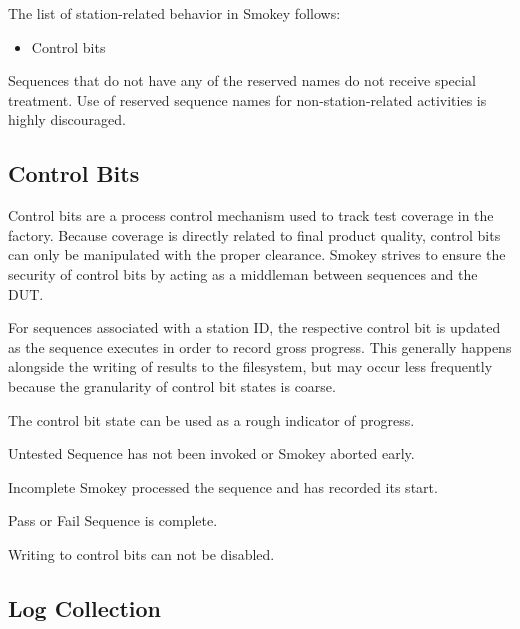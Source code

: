 The list of station-related behavior in Smokey follows:

\begin{itemize}

\item Control bits

\end{itemize}

Sequences that do not have any of the reserved names do not receive special
treatment.  Use of reserved sequence names for non-station-related activities
is highly discouraged.

\subsection{Control Bits}

Control bits are a process control mechanism used to track test coverage in the
factory.  Because coverage is directly related to final product quality,
control bits can only be manipulated with the proper clearance.  Smokey strives
to ensure the security of control bits by acting as a middleman between
sequences and the DUT.

For sequences associated with a station ID, the respective control bit is
updated as the sequence executes in order to record gross progress.  This
generally happens alongside the writing of results to the filesystem, but may
occur less frequently because the granularity of control bit states is coarse.

The control bit state can be used as a rough indicator of progress.

\begin{Definition}

\item[Untested] Sequence has not been invoked or Smokey aborted early.

\item[Incomplete] Smokey processed the sequence and has recorded its start.

\item[Pass \textnormal{or} Fail] Sequence is complete.

\end{Definition}

Writing to control bits can not be disabled.

\subsection{Log Collection}

